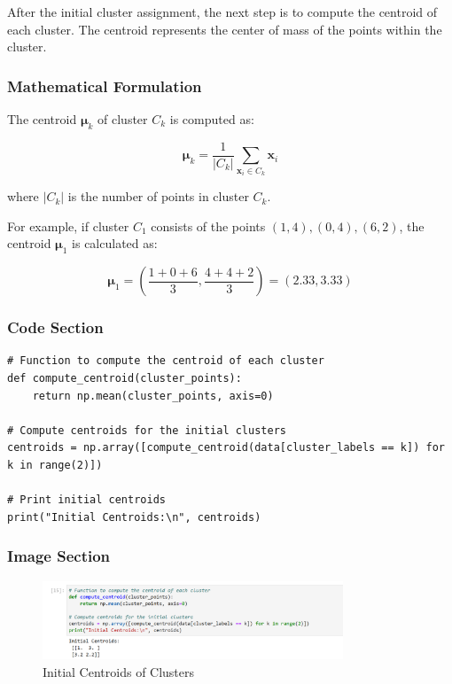 \documentclass{exam}
\begin{document}
After the initial cluster assignment, the next step is to compute the centroid of each cluster. The centroid represents the center of mass of the points within the cluster.

\subsubsection*{Mathematical Formulation}
The centroid \( \mathbf{\mu}_k \) of cluster \( C_k \) is computed as:

\[
\mathbf{\mu}_k = \frac{1}{|C_k|} \sum_{\mathbf{x}_i \in C_k} \mathbf{x}_i
\]

where \( |C_k| \) is the number of points in cluster \( C_k \).

For example, if cluster \( C_1 \) consists of the points \( (1, 4), (0, 4), (6, 2) \), the centroid \( \mathbf{\mu}_1 \) is calculated as:

\[
\mathbf{\mu}_1 = \left( \frac{1+0+6}{3}, \frac{4+4+2}{3} \right) = (2.33, 3.33)
\]

\subsubsection*{Code Section}

\begin{verbatim}
# Function to compute the centroid of each cluster
def compute_centroid(cluster_points):
    return np.mean(cluster_points, axis=0)

# Compute centroids for the initial clusters
centroids = np.array([compute_centroid(data[cluster_labels == k]) for k in range(2)])

# Print initial centroids
print("Initial Centroids:\n", centroids)
\end{verbatim}

\subsubsection*{Image Section}

\begin{figure}[h!]
    \centering
    \includegraphics[width=0.8\textwidth]{images/inital_centroid.png}
    \caption{Initial Centroids of Clusters}
    \label{fig:initial_centroids}
\end{figure}
\end{document}

